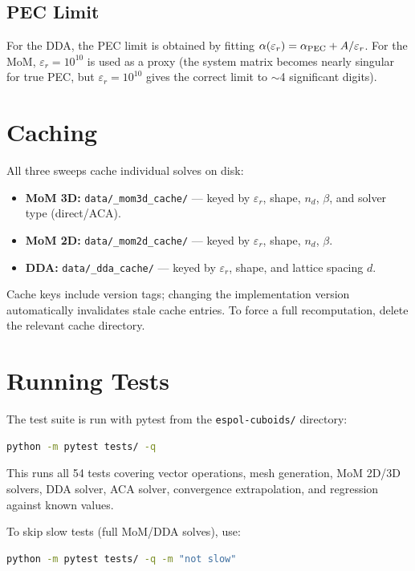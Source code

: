 \documentclass[a4paper,11pt]{article}
\begin{document}
\subsection{PEC Limit}

For the DDA, the PEC limit is obtained by fitting
$\alpha(\varepsilon_r) = \alpha_{\rm PEC} + A/\varepsilon_r$.
For the MoM, $\varepsilon_r = 10^{10}$ is used as a proxy (the
system matrix becomes nearly singular for true PEC, but
$\varepsilon_r = 10^{10}$ gives the correct limit to $\sim$4 significant
digits).

\section{Caching}

All three sweeps cache individual solves on disk:

\begin{itemize}
    \item \textbf{MoM 3D:} \texttt{data/\_mom3d\_cache/} — keyed by
          $\varepsilon_r$, shape, $n_d$, $\beta$, and solver type (direct/ACA).
    \item \textbf{MoM 2D:} \texttt{data/\_mom2d\_cache/} — keyed by
          $\varepsilon_r$, shape, $n_d$, $\beta$.
    \item \textbf{DDA:} \texttt{data/\_dda\_cache/} — keyed by
          $\varepsilon_r$, shape, and lattice spacing $d$.
\end{itemize}

Cache keys include version tags; changing the implementation version
automatically invalidates stale cache entries.  To force a full
recomputation, delete the relevant cache directory.

\section{Running Tests}

The test suite is run with pytest from the \texttt{espol-cuboids/} directory:

\begin{lstlisting}[language=bash]
python -m pytest tests/ -q
\end{lstlisting}

This runs all 54 tests covering vector operations, mesh generation, MoM 2D/3D
solvers, DDA solver, ACA solver, convergence extrapolation, and regression
against known values.

To skip slow tests (full MoM/DDA solves), use:
\begin{lstlisting}[language=bash]
python -m pytest tests/ -q -m "not slow"
\end{lstlisting}
\end{document}
